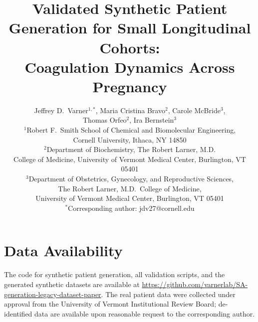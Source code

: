 \documentclass[11pt]{article}
\title{Validated Synthetic Patient Generation for Small Longitudinal Cohorts: \\
Coagulation Dynamics Across Pregnancy}
\author{
Jeffrey D.\ Varner$^{1,*}$,
Maria Cristina Bravo$^{2}$,
Carole McBride$^{3}$,
\\
Thomas Orfeo$^{2}$,
Ira Bernstein$^{3}$
\\[6pt]
{\small $^{1}$Robert F.\ Smith School of Chemical and Biomolecular Engineering,} \\
{\small Cornell University, Ithaca, NY 14850} \\
{\small $^{2}$Department of Biochemistry, The Robert Larner, M.D.} \\
{\small College of Medicine, University of Vermont Medical Center, Burlington, VT 05401} \\
{\small $^{3}$Department of Obstetrics, Gynecology, and Reproductive Sciences,} \\
{\small The Robert Larner, M.D.\ College of Medicine,} \\
{\small University of Vermont Medical Center, Burlington, VT 05401} \\[6pt]
{\small $^{*}$Corresponding author: jdv27@cornell.edu}
}
\date{}
\begin{document}
\maketitle

\begin{abstract}

\end{abstract}







\section*{Data Availability}
The code for synthetic patient generation, all validation scripts, and the
generated synthetic datasets are available at
\url{https://github.com/varnerlab/SA-generation-legacy-dataset-paper}.
The real patient data were collected under approval from the University of Vermont
Institutional Review Board; de-identified
data are available upon reasonable request to the corresponding author.






\clearpage


\clearpage

\end{document}
